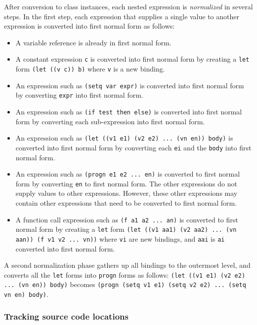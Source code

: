 \documentclass{article}
\begin{document}
After conversion to class instances, each nested expression is
\emph{normalized} in several steps.  In the first step, each
expression that supplies a single value to another expression is
converted into first normal form as follows:

\begin{itemize}
\item A variable reference is already in first normal form.
\item A constant expression \texttt{c} is converted into first normal
  form by creating a \texttt{let} form \texttt{(let ((v c)) b)} where
  \texttt{v} is a new binding. 
\item An expression such as \texttt{(setq var expr)} is converted into
  first normal form by converting \texttt{expr} into first normal
  form.
\item An expression such as \texttt{(if test then else)} is converted
  into first normal form by converting each sub-expression into first
  normal form.
\item An expression such as \texttt{(let ((v1 e1) (v2 e2) ... (vn en))
  body)} is converted into first normal form by converting each
  \texttt{ei} and the \texttt{body} into first normal form.
\item An expression such as \texttt{(progn e1 e2 ... en)} is converted
  to first normal form by converting \texttt{en} to first normal
  form.  The other expressions do not supply values to other
  expressions.  However, these other expressions may contain other
  expressions that need to be converted to first normal form.
\item A function call expression such as \texttt{(f a1 a2 ... an)} is
  converted to first normal form by creating a \texttt{let} form
  \texttt{(let ((v1 aa1) (v2 aa2) ... (vn aan)) (f v1 v2 ... vn))}
  where \texttt{vi} are new bindings, and \texttt{aai} is \texttt{ai}
  converted into first normal form.
\end{itemize}

A second normalization phase gathers up all bindings to the outermost
level, and converts all the \texttt{let} forms into \texttt{progn}
forms as follows: \texttt{(let ((v1 e1) (v2 e2) ... (vn en)) body)}
becomes \texttt{(progn (setq v1 e1) (setq v2 e2) ... (setq vn en)
  body)}.

\subsubsection{Tracking source code locations}
\end{document}
